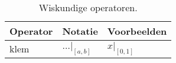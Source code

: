 \begin{table}
  \centering
  \begin{tabular}{@{}lll@{}}\toprule
    Operator       & Notatie        & Voorbeelden \\ \midrule
    klem           & $\dots|_{[a,b]}$ & $x|_{[0, 1]}$ \\ \bottomrule
  \end{tabular}
  \caption{Wiskundige operatoren.}
  \label{tbl:math-operators}
\end{table}
